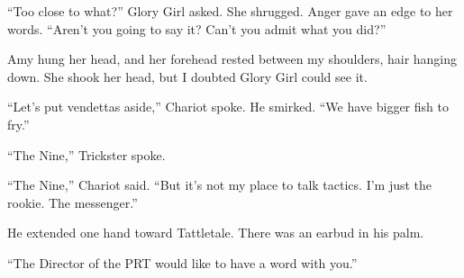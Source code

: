``Too close to what?'' Glory Girl asked.  She shrugged.  Anger gave an edge to her words.  ``Aren't you going to say it?  Can't you admit what you did?''



Amy hung her head, and her forehead rested between my shoulders, hair hanging down.  She shook her head, but I doubted Glory Girl could see it.



``Let's put vendettas aside,'' Chariot spoke.  He smirked.  ``We have bigger fish to fry.''



``The Nine,'' Trickster spoke.



``The Nine,'' Chariot said.  ``But it's not my place to talk tactics.  I'm just the rookie.  The messenger.''



He extended one hand toward Tattletale.  There was an earbud in his palm.



``The Director of the PRT would like to have a word with you.''





